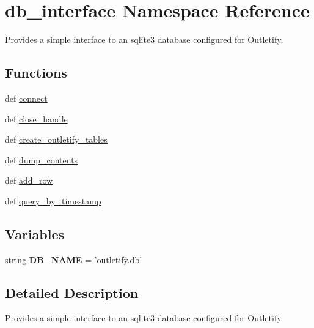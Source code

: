 \hypertarget{namespacedb__interface}{\section{db\-\_\-interface Namespace Reference}
\label{namespacedb__interface}
}


Provides a simple interface to an sqlite3 database configured for Outletify.  


\subsection*{Functions}
\begin{DoxyCompactItemize}
\item 
def \hyperlink{namespacedb__interface_a9dc663751479c6d0cec83e4895f65a43}{connect}
\item 
def \hyperlink{namespacedb__interface_a37ec95a825002d2d77c94c0f76512a0b}{close\-\_\-handle}
\item 
def \hyperlink{namespacedb__interface_a8e6ba6cc9f46178111842f698946c6fb}{create\-\_\-outletify\-\_\-tables}
\item 
def \hyperlink{namespacedb__interface_a03088d2791eade0146f7fd5bbc5926a0}{dump\-\_\-contents}
\item 
def \hyperlink{namespacedb__interface_ab7a5ac2ffbd107cc2f0a5745efd8c65c}{add\-\_\-row}
\item 
def \hyperlink{namespacedb__interface_a98ea80b49a8a41bffaecfb374b007abd}{query\-\_\-by\-\_\-timestamp}
\end{DoxyCompactItemize}
\subsection*{Variables}
\begin{DoxyCompactItemize}
\item 
\hypertarget{namespacedb__interface_a24d07298c20425fbb8b12f569270582c}{string {\bfseries D\-B\-\_\-\-N\-A\-M\-E} = 'outletify.\-db'}\label{namespacedb__interface_a24d07298c20425fbb8b12f569270582c}

\end{DoxyCompactItemize}


\subsection{Detailed Description}
Provides a simple interface to an sqlite3 database configured for Outletify. 


